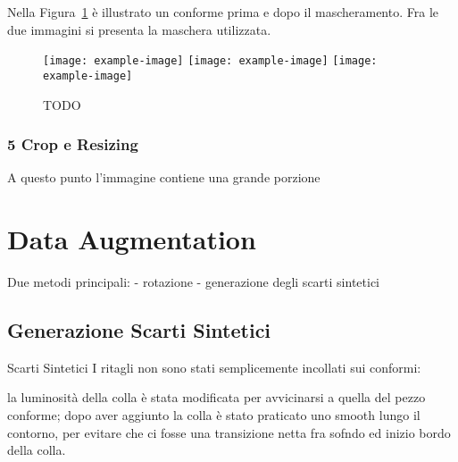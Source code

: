 Nella Figura~\ref{fig:mask} è illustrato un conforme prima e dopo il mascheramento.
Fra le due immagini si presenta la maschera utilizzata.
\begin{figure}[ht] %
  \begin{center}
    \texttt{[image: example-image]}
    \texttt{[image: example-image]}
    \texttt{[image: example-image]}
    \caption{TODO}
    \label{fig:mask}
  \end{center}
\end{figure}

\subsubsection{5 Crop e Resizing}
A questo punto l'immagine contiene una grande porzione 




\clearpage
\section {Data Augmentation}
Due metodi principali:
 - rotazione
 - generazione degli scarti sintetici

\subsection {Generazione Scarti Sintetici}


Scarti Sintetici
 I ritagli non sono stati semplicemente incollati sui conformi:

 la luminosità della colla è stata modificata per avvicinarsi a quella del pezzo conforme;
 dopo aver aggiunto la colla è stato praticato uno smooth lungo il contorno, per evitare che ci fosse una transizione netta fra sofndo ed inizio bordo della colla.







































